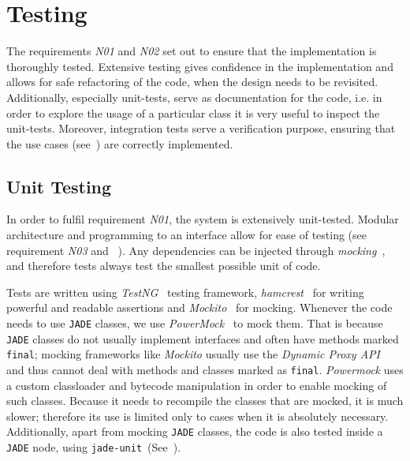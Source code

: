 \section{Testing}
\label{Chapters/Implementation/Testing}
The requirements \textit{N01} and \textit{N02} set out to ensure that the implementation is thoroughly tested. Extensive testing gives confidence in the implementation and allows for safe refactoring of the code, when the design needs to be revisited. Additionally, especially unit-tests, serve as documentation for the code, i.e. in order to explore the usage of a particular class it is very useful to inspect the unit-tests. Moreover, integration tests serve a verification purpose, ensuring that the use cases (see~) are correctly implemented.

\subsection{Unit Testing}
In order to fulfil requirement \textit{N01}, the system is extensively unit-tested. Modular architecture and programming to an interface allow for ease of testing (see requirement \textit{N03} and ~). Any dependencies can be injected through \textit{mocking}~\citep{Mockito, Powermock}, and therefore tests always test the smallest possible unit of code. 

Tests are written using \textit{TestNG}~\cite{TestNG} testing framework, \textit{hamcrest}~\cite{Hamcrest} for writing powerful and readable assertions and \textit{Mockito}~\cite{Mockito} for mocking. Whenever the code needs to use \texttt{JADE} classes, we use \textit{PowerMock}~\cite{Powermock} to mock them. That is because \texttt{JADE} classes do not usually implement interfaces and often have methods marked \texttt{final}; mocking frameworks like \textit{Mockito} usually use the \textit{Dynamic Proxy API}~\cite{DynamicProxy} and thus cannot deal with methods and classes marked as \texttt{final}. \textit{Powermock} uses a custom classloader and bytecode manipulation in order to enable mocking of such classes. Because it needs to recompile the classes that are mocked, it is much slower; therefore its use is limited only to cases when it is absolutely necessary. Additionally, apart from mocking \texttt{JADE} classes, the code is also tested inside a \texttt{JADE} node, using \texttt{jade-unit}~(See~). 

